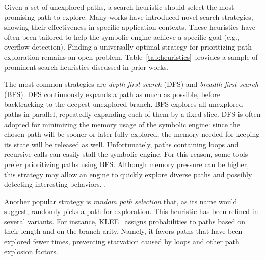 Given a set of unexplored paths, a search heuristic should select the most promising path to explore. Many works have introduced novel search strategies, showing their effectiveness in specific application contexts. These heuristics have often been tailored to help the symbolic engine achieve a specific goal (e.g., overflow detection). Finding a universally optimal strategy for prioritizing path exploration remains an open problem. Table~\ref{tab:heuristics} provides a sample of prominent search heuristics discussed in prior works. 

The most common strategies are {\em depth-first search} (DFS) and {\em breadth-first search} (BFS). DFS continuously expands a path as much as possible, before backtracking to the deepest unexplored branch. BFS explores all unexplored paths in parallel, repeatedly expanding each of them by a fixed slice. DFS is often adopted for minimizing the memory usage of the symbolic engine: since the chosen path will be sooner or later fully explored, the memory needed for keeping its state will be released as well. Unfortunately, paths containing loops and recursive calls can easily stall the symbolic engine. For this reason, some tools prefer prioritizing paths using BFS. Although memory pressure can be higher, this strategy may allow an engine to quickly explore diverse paths and possibly detecting interesting behaviors. .

Another popular strategy is {\em random path selection} that, as its name would suggest, randomly picks a path for exploration. This heuristic has been refined in several variants. For instance, {\sc KLEE}~\cite{KLEE-OSDI08} assigns probabilities to paths based on their length and on the branch arity. Namely, it favors paths that have been explored fewer times, preventing starvation caused by loops and other path explosion factors.

